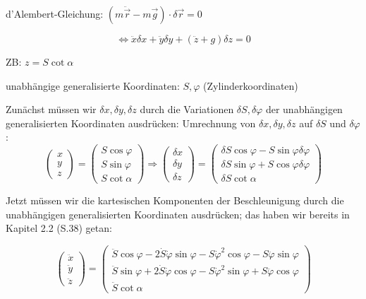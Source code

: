 \documentclass[10pt, letterpaper]{article}
\begin{document}
d'Alembert-Gleichung: $(m\ddot{\vec{r}}-m\vec{g})\cdot\delta\vec{r}=0$

\[\Leftrightarrow \ddot{x}\delta x + \ddot{y}\delta y + (\ddot{z}+g)\delta z = 0\]

ZB: $z = S\cot\alpha$

unabhängige generalisierte Koordinaten: $S,\varphi$ (Zylinderkoordinaten)

Zunächst müssen wir $\delta x, \delta y, \delta z$ durch die Variationen $\delta S, \delta\varphi$ der unabhängigen generalisierten Koordinaten ausdrücken:
Umrechnung von $\delta x, \delta y, \delta z$ auf $\delta S$ und $\delta \varphi$:
\[\begin{pmatrix} x \\ y \\ z \end{pmatrix} = \begin{pmatrix} S\cos\varphi \\ S\sin\varphi \\ S\cot\alpha \end{pmatrix} \Rightarrow \begin{pmatrix} \delta x \\ \delta y \\ \delta z \end{pmatrix} = \begin{pmatrix} \delta S\cos\varphi - S\sin\varphi\delta\varphi \\ \delta S\sin\varphi + S\cos\varphi\delta\varphi \\ \delta S\cot\alpha \end{pmatrix}\]

Jetzt müssen wir die kartesischen Komponenten der Beschleunigung durch die unabhängigen generalisierten Koordinaten ausdrücken; das haben wir bereits in Kapitel 2.2 (S.38) getan:

\[\begin{pmatrix} \ddot{x} \\ \ddot{y} \\ \ddot{z} \end{pmatrix} = \begin{pmatrix} \ddot{S}\cos\varphi - 2\dot{S}\dot{\varphi}\sin\varphi - S\dot{\varphi}^2\cos\varphi - S\ddot{\varphi}\sin\varphi \\ \ddot{S}\sin\varphi + 2\dot{S}\dot{\varphi}\cos\varphi - S\dot{\varphi}^2\sin\varphi + S\ddot{\varphi}\cos\varphi \\ \ddot{S}\cot\alpha \end{pmatrix}\]
\end{document}
